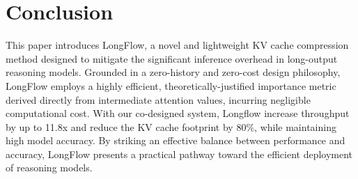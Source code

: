 \section{Conclusion}
This paper introduces LongFlow, a novel and lightweight KV cache compression method designed to mitigate the significant inference overhead in long-output reasoning models. Grounded in a zero-history and zero-cost design philosophy, LongFlow employs a highly efficient, theoretically-justified importance metric derived directly from intermediate attention values, incurring negligible computational cost.
With our co-designed system, Longflow increase throughput by up to 11.8x and reduce the KV cache footprint by 80\%, while maintaining high model accuracy. By striking an effective balance between performance and accuracy, LongFlow presents a practical pathway toward the efficient deployment of reasoning models.